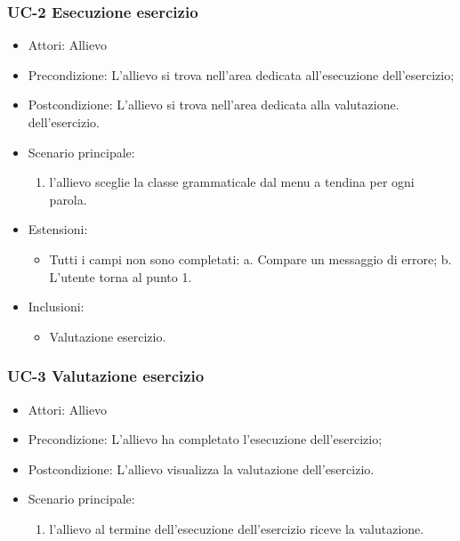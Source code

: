 	\subsubsection{UC-2 Esecuzione esercizio}
		\begin{itemize}
			\item Attori: Allievo
			\item Precondizione: L'allievo si trova nell'area dedicata all'esecuzione dell'esercizio;
			\item Postcondizione: L'allievo si trova nell'area dedicata alla valutazione. dell'esercizio.
			\item Scenario principale:
				\begin{enumerate}
					\item l'allievo sceglie la classe grammaticale dal menu a tendina per ogni parola.
				\end{enumerate}
			\item Estensioni: 
				\begin{itemize}
					\item Tutti i campi non sono completati:
						a. Compare un messaggio di errore;
						b. L'utente torna al punto 1.
				\end{itemize}
			\item Inclusioni:
				\begin{itemize}
					\item Valutazione esercizio.
				\end{itemize}
			\end{itemize}
	\subsubsection{UC-3 Valutazione esercizio}
	\begin{itemize}
			\item Attori: Allievo
			\item Precondizione: L'allievo ha completato l'esecuzione dell'esercizio;
			\item Postcondizione: L'allievo visualizza la valutazione dell'esercizio.
			\item Scenario principale:
				\begin{enumerate}
					\item l'allievo al termine dell'esecuzione dell'esercizio riceve la valutazione.
				\end{enumerate}
			\end{itemize}
